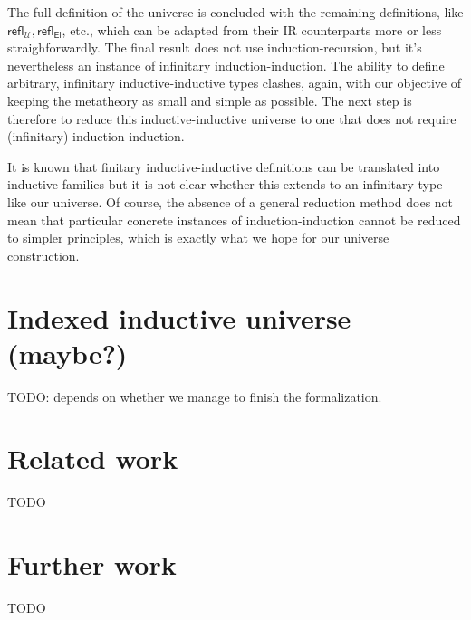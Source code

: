 \documentclass{easychair}
\newcommand{\setoidU}{\mathcal{U}}
\newcommand{\El}{\textsf{El}}
\newcommand{\reflu}{\textsf{refl}_\setoidU}
\newcommand{\reflel}{\textsf{refl}_\El}
\begin{document}
The full definition of the universe is concluded with the remaining definitions,
like $\reflu, \reflel$, etc., which can be adapted from their IR counterparts
more or less straighforwardly. The final result does not use
induction-recursion, but it's nevertheless an instance of infinitary
induction-induction. The ability to define arbitrary, infinitary
inductive-inductive types clashes, again, with our objective of keeping the
metatheory as small and simple as possible. The next step is therefore to reduce
this inductive-inductive universe to one that does not require (infinitary)
induction-induction.

It is known that finitary inductive-inductive definitions can be translated into
inductive families \cite{iit-erasure,iit-to-ix,induction-is-enough} but it is
not clear whether this extends to an infinitary type like our universe.
%
Of course, the absence of a general reduction method does not mean that
particular concrete instances of induction-induction cannot be reduced to
simpler principles, which is exactly what we hope for our universe construction.

\section{Indexed inductive universe (maybe?)}

TODO: depends on whether we manage to finish the formalization.

\section{Related work}

TODO

\section{Further work}

TODO



\end{document}
